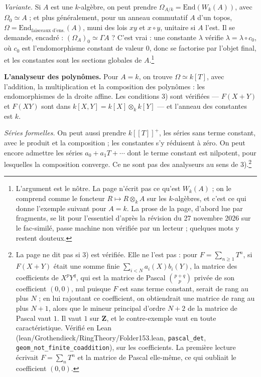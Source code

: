 \documentclass[11pt,a4paper]{article}
\begin{document}
\emph{Variante.} Si $A$ est une $k$-algèbre, on peut prendre
$\Omega_{A/k} = \mathrm{End}(W_{k}(A))$, avec $\Omega_{0} \simeq A$ ; et plus
généralement, pour un anneau commutatif $A$ d'un topos,
$\Omega = \mathrm{End}_{\text{faisceaux d'ens.}}(A)$, muni des lois $xy$ et
$x \circ y$, unitaire si $A$ l'est. Il se demande, encadré :
$(\Omega_{A})_{0} \simeq \Gamma A$ ? C'est vrai : une constante $\lambda$ vérifie
$\lambda = \lambda \circ c_{0}$, où $c_{0}$ est l'endomorphisme constant de valeur
$0$, donc se factorise par l'objet final, et les constantes sont les sections
globales de $A$.\footnote{L'argument est le nôtre. La page n'écrit pas ce qu'est
$W_{k}(A)$ ; on le comprend comme le foncteur $R \mapsto R \otimes_{k} A$ sur les
$k$-algèbres, et c'est ce qui donne l'exemple suivant pour $A = k$. La prose de
la page, d'abord lue par fragments, se lit pour l'essentiel d'après la révision
du 27 novembre 2026 sur le fac-similé, passe machine non vérifiée par un
lecteur ; quelques mots y restent douteux.}

\textbf{L'analyseur des polynômes.} Pour $A = k$, on trouve $\Omega \simeq k[T]$,
avec l'addition, la multiplication et la composition des polynômes : les
endomorphismes de la droite affine. Les conditions 3) sont vérifiées --- $F(X +
Y)$ et $F(XY)$ sont dans $k[X, Y] = k[X] \otimes_{k} k[Y]$ --- et l'anneau des
constantes est $k$.

\emph{Séries formelles.} On peut aussi prendre $k[[T]]^{+}$, les séries sans
terme constant, avec le produit et la composition ; les constantes s'y réduisent
à zéro. On peut encore admettre les séries $a_{0} + a_{1}T + \cdots$ dont le terme
constant est nilpotent, pour lesquelles la composition converge. Ce ne sont pas
des analyseurs au sens de 3).\footnote{La page ne dit pas si 3) est vérifiée. Elle
ne l'est pas : pour $F = \sum_{n \geq 1} T^{n}$, si $F(X + Y)$ était une somme
finie $\sum_{i < N} a_{i}(X) b_{i}(Y)$, la matrice des coefficients de
$X^{p}Y^{q}$, qui est la matrice de Pascal $\binom{p+q}{p}$ privée de son
coefficient $(0, 0)$, nul puisque $F$ est sans terme constant, serait de rang
au plus $N$ ; en lui rajoutant ce coefficient, on obtiendrait une matrice de
rang au plus $N + 1$, alors que le mineur principal d'ordre $N + 2$ de la
matrice de Pascal vaut $1$. Il vaut $1$ sur $\mathbf{Z}$, et le contre-exemple
vaut en toute caractéristique. Vérifié en Lean
(lean/Grothendieck/RingTheory/Folder153.lean, \texttt{pascal\_det},
\texttt{geom\_not\_finite\_coaddition}), sur les coefficients. La première
lecture écrivait $F = \sum_n T^n$ et la matrice de Pascal elle-même, ce qui
oubliait le coefficient $(0, 0)$.}
\end{document}
